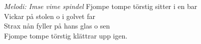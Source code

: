 {\footnotesize\textit{Melodi: Imse vime spindel}}
Fjompe tompe törstig sitter i en bar\\
Vickar på stolen o i golvet far\\
Strax nån fyller på hans glas o sen\\
Fjompe tompe törstig klättrar upp igen.
\par
\vspace{10pt}

